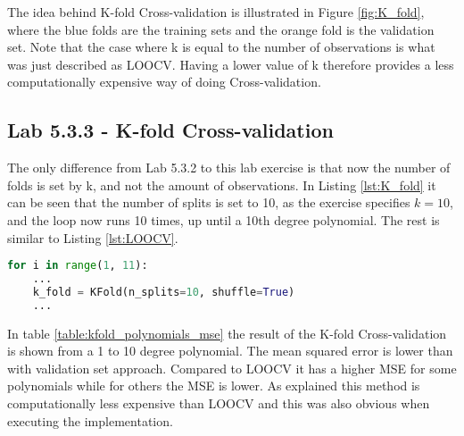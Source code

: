 
The idea behind K-fold Cross-validation is illustrated in Figure \ref{fig:K_fold}, where the blue folds are the training sets and the orange fold is the validation set. Note that the case where k is equal to the number of observations is what was just described as LOOCV. Having a lower value of k therefore provides a less computationally expensive way of doing Cross-validation.

\FloatBarrier
\subsection{Lab 5.3.3 - K-fold Cross-validation}
The only difference from Lab 5.3.2 to this lab exercise is that now the number of folds is set by k, and not the amount of observations. In Listing \ref{lst:K_fold} it can be seen that the number of splits is set to 10, as the exercise specifies $k=10$, and the loop now runs 10 times, up until a 10th degree polynomial. The rest is similar to Listing \ref{lst:LOOCV}.

\begin{lstlisting}[language=Python, label=lst:K_fold, caption=K-fold Cross-validation loop]
for i in range(1, 11):
	...
	k_fold = KFold(n_splits=10, shuffle=True) 
	...
\end{lstlisting}
\FloatBarrier

In table \ref{table:kfold_polynomials_mse} the result of the K-fold Cross-validation is shown from a 1 to 10 degree polynomial. The mean squared error is lower than with validation set approach. Compared to LOOCV it has a higher MSE for some polynomials while for others the MSE is lower. As explained this method is computationally less expensive than LOOCV and this was also obvious when executing the implementation.

